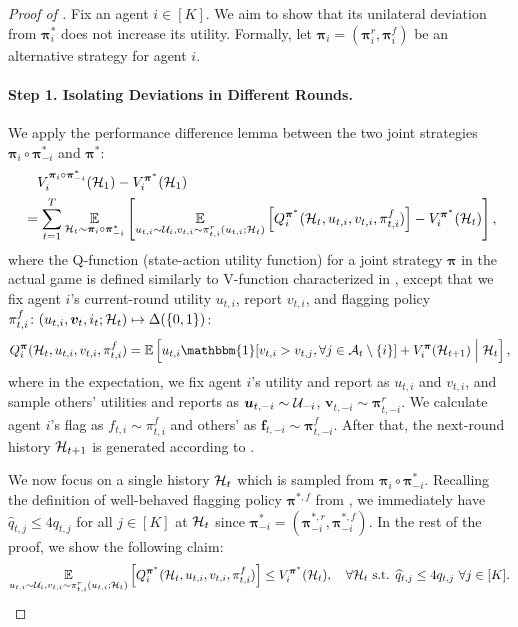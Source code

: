 \begin{proof}[Proof of ]
Fix an agent $i\in[K]$. We aim to show that its unilateral deviation from $\bm \pi_i^\ast$ does not increase its utility. Formally, let ${\bm \pi}_i=({\bm \pi}_i^r,{\bm \pi}_i^f)$ be an alternative strategy for agent $i$.

\paragraph{Step 1. Isolating Deviations in Different Rounds.}
We apply the performance difference lemma \citep{kakade2002approximately} between the two joint strategies $\bm \pi_i\circ \bm \pi_{-i}^\ast$ and $\bm \pi^\ast$:
\begin{align}
&\quad V_i^{\bm \pi_i\circ \bm \pi_{-i}^\ast}(\mH_1)-V_i^{\bm \pi^\ast}(\mH_1) \nonumber\\
&=\sum_{t=1}^T \E_{\mH_t\sim \bm \pi_i\circ \bm \pi_{-i}^\ast}\left [\E_{u_{t,i}\sim \mV_i,v_{t,i}\sim \pi_{t,i}^r(u_{t,i};\mH_t)}\left [Q_i^{\bm \pi^\ast}(\mH_t,u_{t,i},v_{t,i},\pi_{t,i}^f)\right ]-V_i^{\bm \pi^\ast}(\mH_t)\right ],\label{eq:performance difference lemma}
\end{align}
where the Q-function (state-action utility function) for a joint strategy $\bm \pi$ in the actual game is defined similarly to V-function characterized in , except that we fix agent $i$'s current-round utility $u_{t,i}$, report $v_{t,i}$, and flagging policy $\pi_{t,i}^f\colon (u_{t,i},\bm v_t,i_t;\mathcal{H}_t)\mapsto \Delta(\{0,1\})$:
\begin{align}
Q_i^{\bm \pi}(\mH_t,u_{t,i},v_{t,i},\pi_{t,i}^f)=\E\left [u_{t,i}\mathbbm{1}[v_{t,i}>v_{t,j},\forall j\in \mA_t\setminus \{i\}]+V_i^{\bm \pi}(\mH_{t+1})\middle \vert \vphantom{\tilde V_i^{{\bm \pi}^{\ast,r}}(\tilde \mH_{t+1})} \mH_t\right ],\label{eq:Q-func recursive}
\end{align}
where in the expectation, we fix agent $i$'s utility and report as $u_{t,i}$ and $v_{t,i}$, and sample others' utilities and reports as $\bm u_{t,-i}\sim \mathcal{U}_{-i}$, $\bm v_{t,-i}\sim \bm \pi_{t,-i}^r$. We calculate agent $i$'s flag as $f_{t,i}\sim \pi_{t,i}^f$ and others' as $\bm f_{t,-i}\sim \bm \pi_{t,-i}^f$. After that, the next-round history $\mathcal{H}_{t+1}$ is generated according to .

We now focus on a single history $\mathcal{H}_t$ which is sampled from $\bm \pi_i\circ \bm \pi_{-i}^\ast$. Recalling the definition of well-behaved flagging policy ${\bm \pi}^{\ast,f}$ from , we immediately have $\hat q_{t,j}\le 4q_{t,j}$ for all $j\in [K]$ at $\mathcal{H}_t$ since $\bm \pi_{-i}^\ast=({\bm \pi}_{-i}^{\ast,r},{\bm \pi}_{-i}^{\ast,f})$. In the rest of the proof, we show the following claim:
\begin{equation}\label{eq:obj after performance difference lemma}
\E_{u_{t,i}\sim \mV_i,v_{t,i}\sim \pi_{t,i}^r(u_{t,i};\mH_t)}\left [Q_i^{\bm \pi^\ast}(\mH_t,u_{t,i},v_{t,i},\pi_{t,i}^f)\right ]\le V_i^{\bm \pi^\ast}(\mH_t),\quad \forall \mH_t\text{ s.t. }\hat q_{t,j}\le 4q_{t,j}~\forall  j\in [K].
\end{equation}


\end{proof}

